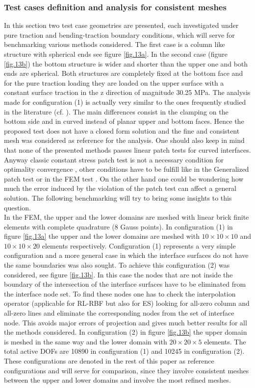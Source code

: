  \subsubsection{Test cases definition and analysis for consistent meshes}\label{ssec41}
 In this section two test case geometries are presented, each investigated under pure traction and bending-traction boundary conditions, which will serve for benchmarking various methods considered. The first case is a column like structure with spherical ends see figure \ref{fig.13a}. In the second case (figure \ref{fig.13b}) the bottom structure is wider and shorter than the upper one and both ends are spherical. Both structures are completely fixed at the bottom face and for the pure traction loading they are loaded on the upper surface with a constant surface traction in the z direction of magnitude 30.25 MPa. The analysis made for configuration (1) is actually very similar to the ones frequently studied in the literature (cf. \cite{song2017virtual}). The main differences consist in the clamping on the bottom side and in curved instead of planar upper and bottom faces. Hence the proposed test does not have a closed form solution and the fine and consistent mesh was considered as reference for the analysis. One should also keep in mind that none of the presented methods passes linear patch tests for curved interfaces. Anyway classic constant stress patch test is not a necessary condition for optimality convergence \cite{stummel1980limitations}, other conditions have to be fulfill like in the Generalized patch test \cite{stummel1979generalized} or in the FEM test \cite{shi1987fem} . On the other hand one could be wondering how much the error induced by the violation of the patch test can affect a general solution. The following benchmarking will try to bring some insights to this question.\\
 In the FEM, the upper and the lower domains are meshed with linear brick finite elements with complete quadrature (8 Gauss points). In configuration (1) in figure \ref{fig.13a} the upper and the lower domains are meshed with $10\times10\times10$ and $10\times10\times20$ elements respectively. Configuration (1) represents a very simple configuration and a more general case in which the interface surfaces do not have the same boundaries was also sought. To achieve this configuration (2) was considered, see figure \ref{fig.13b}. In this case the nodes that are not inside the boundary of the intersection of the interface surfaces have to be eliminated from the interface node set. To find these nodes one has to check the interpolation operator (applicable for RL-RBF but also for ES) looking for all-zero column and all-zero lines and eliminate the corresponding nodes from the set of interface node. This avoids major errors of projection and gives much better results for all the methods considered. In configuration (2) in figure \ref{fig.13b} the upper domain is meshed in the same way and the lower domain with $20\times20\times5$ elements. The total active DOFs are 10890 in configuration (1) and 10245 in configuration (2). These configurations are denoted in the rest of this paper as reference configurations and will serve for comparison, since they involve consistent meshes between the upper and lower domains and involve the most refined meshes.
